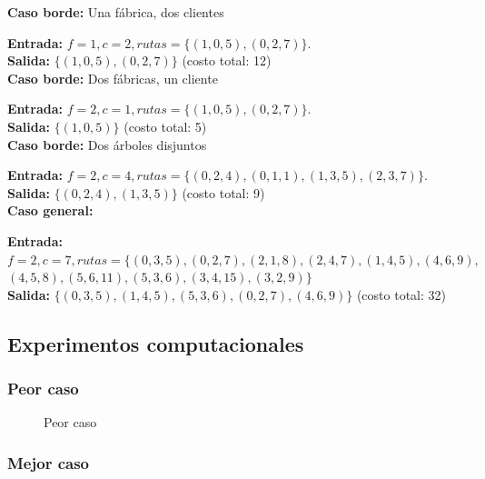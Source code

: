 \documentclass[a4paper, 10pt, twoside]{article}
\newcommand{\tresgraficos}[3]{
    \newcommand{\separacion}{-2.2em}
    \vspace{\separacion}
    
    \vspace{\separacion}
    
    \vspace{\separacion}
    
}
\begin{document}
\textbf{Caso borde:} Una fábrica, dos clientes

\textbf{Entrada:} $f = 1, c = 2, rutas = \{ (1, 0, 5), (0, 2, 7) \}$. \\
\textbf{Salida:}  $\{ (1, 0, 5), (0, 2, 7) \}$ (costo total: 12)
\\

\textbf{Caso borde:} Dos fábricas, un cliente

\textbf{Entrada:} $f = 2, c = 1, rutas = \{ (1, 0, 5), (0, 2, 7) \}$. \\
\textbf{Salida:}  $\{ (1, 0, 5) \}$ (costo total: 5)
\\

\textbf{Caso borde:} Dos árboles disjuntos

\textbf{Entrada:} $f = 2, c = 4, rutas = \{ (0, 2, 4), (0, 1, 1), (1, 3, 5), (2, 3, 7) \}$. \\
\textbf{Salida:}  $\{ (0, 2, 4), (1, 3, 5) \}$ (costo total: 9)
\\

\textbf{Caso general:}

\textbf{Entrada:} $f = 2, c = 7, rutas = \{ (0, 3, 5), (0, 2, 7), (2, 1, 8), (2, 4, 7), (1, 4, 5), (4, 6, 9), $ \\
$ (4, 5, 8), (5, 6, 11), (5, 3, 6), (3, 4, 15), (3, 2, 9) \}$ \\
\textbf{Salida:}  $\{ (0, 3, 5), (1, 4, 5), (5, 3, 6), (0, 2, 7), (4, 6, 9) \}$ (costo total: 32)


\subsection{Experimentos computacionales}

\newpage


\subsubsection{Peor caso}

\begin{figure}[H]
  \centering
  \tresgraficos{problema3-peor-caso}
               {problema3-peor-caso-logn}
               {problema3-peor-caso-n}
  \caption{Peor caso}
\end{figure}


\subsubsection{Mejor caso}
\end{document}
